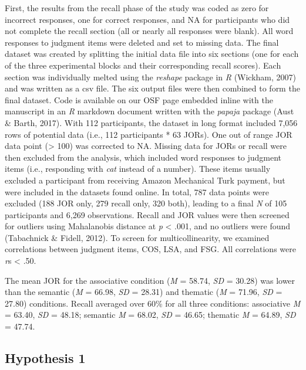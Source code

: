 \documentclass[english,man]{apa6}
\theoremstyle{definition}
\theoremstyle{definition}
\theoremstyle{definition}
\theoremstyle{remark}
\begin{document}
First, the results from the recall phase of the study was coded as zero
for incorrect responses, one for correct responses, and NA for
participants who did not complete the recall section (all or nearly all
responses were blank). All word responses to judgment items were deleted
and set to missing data. The final dataset was created by splitting the
initial data file into six sections (one for each of the three
experimental blocks and their corresponding recall scores). Each section
was individually melted using the \emph{reshape} package in \emph{R}
(Wickham, 2007) and was written as a csv file. The six output files were
then combined to form the final dataset. Code is available on our OSF
page embedded inline with the manuscript in an \emph{R} markdown
document written with the \emph{papaja} package (Aust \& Barth, 2017).
With 112 participants, the dataset in long format included 7,056 rows of
potential data (i.e., 112 participants * 63 JORs). One out of range JOR
data point (\textgreater{} 100) was corrected to NA. Missing data for
JORs or recall were then excluded from the analysis, which included word
responses to judgment items (i.e., responding with \emph{cat} instead of
a number). These items usually excluded a participant from receiving
Amazon Mechanical Turk payment, but were included in the datasets found
online. In total, 787 data points were excluded (188 JOR only, 279
recall only, 320 both), leading to a final \emph{N} of 105 participants
and 6,269 observations. Recall and JOR values were then screened for
outliers using Mahalanobis distance at \emph{p} \textless{} .001, and no
outliers were found (Tabachnick \& Fidell, 2012). To screen for
multicollinearity, we examined correlations between judgment items, COS,
LSA, and FSG. All correlations were \emph{r}s \textless{} .50.

The mean JOR for the associative condition (\emph{M} = 58.74, \emph{SD}
= 30.28) was lower than the semantic (\emph{M} = 66.98, \emph{SD} =
28.31) and thematic (\emph{M} = 71.96, \emph{SD} = 27.80) conditions.
Recall averaged over 60\% for all three conditions: associative \emph{M}
= 63.40, \emph{SD} = 48.18; semantic \emph{M} = 68.02, \emph{SD} =
46.65; thematic \emph{M} = 64.89, \emph{SD} = 47.74.

\subsection{Hypothesis 1}\label{hypothesis-1}
\end{document}
